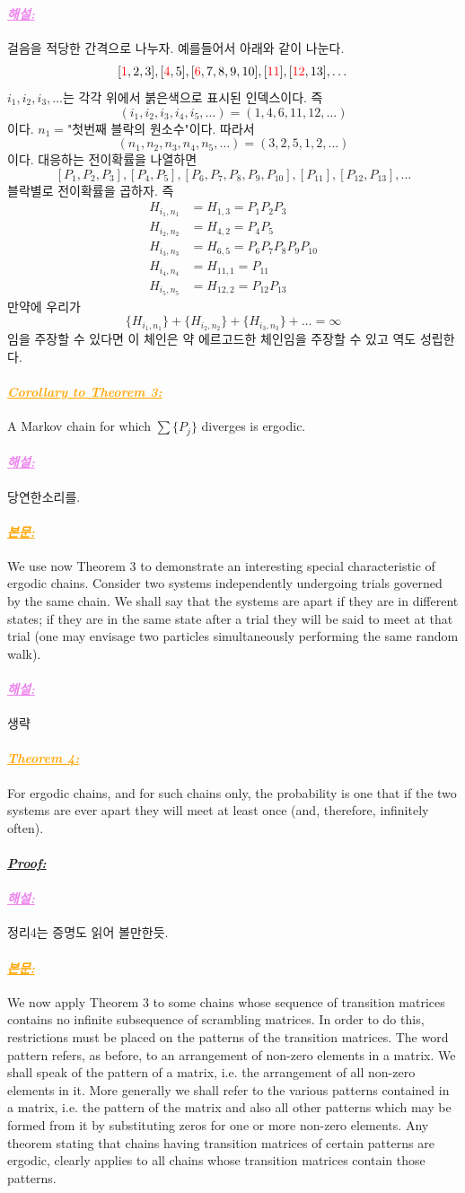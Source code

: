\documentclass[12pt,oneside,english,a4paper]{article}
\newcommand{\para}[1]{\paragraph{\LARGE\it\underline{\textbf{#1:}}}\LARGE}
\newcommand{\paraviolet}[1]{\paragraph{\LARGE\textcolor{violet}{\it\underline{\textbf{#1:}}}}\LARGE}
\newcommand{\paraorange}[1]{\paragraph{\LARGE\textcolor{orange}{\it\underline{\textbf{#1:}}}}\LARGE}
\begin{document}
\paraviolet{해설} 걸음을 적당한 간격으로 나누자. 예를들어서 아래와 같이 나눈다. 
\[
[\textcolor{red}{1},2,3],[\textcolor{red}{4},5],[\textcolor{red}{6},7,8,9,10],[\textcolor{red}{11}],[\textcolor{red}{12},13],\dots
\]
$i_1,i_2,i_3,\dots$는 각각 위에서 붉은색으로 표시된 인덱스이다. 즉 
\[
(i_1,i_2,i_3,i_4,i_5,\dots)=(1,4,6,11,12,\dots)
\]
이다. $n_1=\mbox{"첫번째 블락의 원소수"}$이다. 따라서 
\[
(n_1,n_2,n_3,n_4,n_5,\dots)=(3,2,5,1,2,\dots)
\]
이다. 대응하는 전이확률을 나열하면 
\[
[P_1,P_2,P_3],[P_4,P_5],[P_6,P_7,P_8,P_9,P_{10}],[P_{11}],[P_{12},P_{13}],\dots
\]
블락별로 전이확률을 곱하자. 즉 
\begin{align*}
H_{i_1,n_1}&=H_{1,3}=P_1P_2P_3 \\
H_{i_2,n_2}&=H_{4,2}=P_4P_5 \\
H_{i_3,n_3}&=H_{6,5}=P_6P_7P_8P_9P_{10} \\
H_{i_4,n_4}&=H_{11,1}=P_{11} \\
H_{i_5,n_5}&=H_{12,2}=P_{12}P_{13} 
\end{align*}
만약에 우리가 
\[
\{H_{i_1,n_1}\}+\{H_{i_2,n_2}\}+\{H_{i_3,n_3}\}+\dots = \infty
\]
임을 주장할 수 있다면 이 체인은 약 에르고드한 체인임을 주장할 수 있고 역도 성립한다. 


\paraorange{Corollary to Theorem 3} A Markov chain for which $\sum \{P_j\}$ diverges is ergodic. 

\paraviolet{해설} 당연한소리를. 

\paraorange{본문} We use now Theorem 3 to demonstrate an interesting special characteristic of ergodic chains. Consider two systems independently undergoing trials governed by
the same chain. We shall say that the systems are apart if they are in different states; if they are in the same state after a trial they will be said to meet at that trial (one may envisage two particles simultaneously performing the same random walk).

\paraviolet{해설} 생략 

\paraorange{Theorem 4} For ergodic chains, and for such chains only, the probability is one that if the two systems are ever apart they will meet at least once (and, therefore, infinitely often).

\para{Proof}
\paraviolet{해설} 정리4는 증명도 읽어 볼만한듯. 

\paraorange{본문} We now apply Theorem 3 to some chains whose sequence of transition matrices contains no infinite subsequence of scrambling matrices. In order to do this, restrictions must be placed on the patterns of the transition matrices. The word pattern refers, as before, to an arrangement of non-zero elements in a matrix. We shall speak of the pattern of a matrix, i.e. the arrangement of all non-zero elements in it. More generally we shall refer to the various patterns contained in a matrix, i.e. the pattern of the matrix and also all other patterns which may be formed from it by substituting zeros for one or more non-zero elements. Any theorem stating that chains having transition matrices of certain patterns are ergodic, clearly applies to all chains whose transition matrices contain those patterns.
\end{document}
